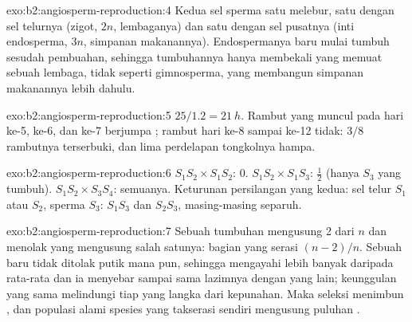 \begin{solution}{exo:b2:angiosperm-reproduction:4}
Kedua sel sperma satu  melebur, satu dengan sel
telurnya (zigot, $2n$, lembaganya) dan satu dengan sel pusatnya (inti
endosperma, $3n$, simpanan makanannya). Endospermanya baru mulai tumbuh
sesudah pembuahan, sehingga tumbuhannya hanya membekali  yang
memuat sebuah lembaga, tidak seperti gimnosperma, yang membangun
simpanan makanannya lebih dahulu.
\end{solution}

\begin{solution}{exo:b2:angiosperm-reproduction:5}
$25/1.2 = \qty{21}{h}$. Rambut yang muncul pada hari ke-5, ke-6, dan
ke-7 berjumpa ; rambut hari ke-8 sampai ke-12 tidak: $3/8$
rambutnya terserbuki, dan lima perdelapan tongkolnya hampa.
\end{solution}

\begin{solution}{exo:b2:angiosperm-reproduction:6}
$S_1S_2\times S_1S_2$: 0. $S_1S_2\times S_1S_3$: $\tfrac12$ (hanya
 $S_3$ yang tumbuh). $S_1S_2\times S_3S_4$: semuanya.
Keturunan persilangan yang kedua: sel telur $S_1$ atau $S_2$, sperma
$S_3$: $S_1S_3$ dan $S_2S_3$, masing-masing separuh.
\end{solution}

\begin{solution}{exo:b2:angiosperm-reproduction:7}
Sebuah tumbuhan mengusung 2 dari $n$  dan menolak 
yang mengusung salah satunya: bagian yang serasi $(n - 2)/n$. Sebuah
 baru tidak ditolak putik mana pun, sehingga 
mengayahi lebih banyak  daripada rata-rata dan ia menyebar sampai
sama lazimnya dengan yang lain; keunggulan yang sama melindungi tiap
 yang langka dari kepunahan. Maka seleksi menimbun , dan
populasi alami spesies yang takserasi sendiri mengusung puluhan .
\end{solution}

